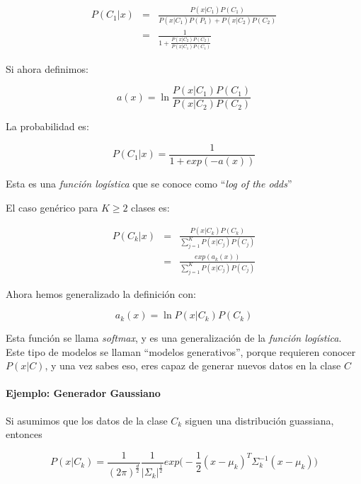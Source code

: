 \begin{eqnarray*}
 P(C_1 | x)
 &=&
 \frac{P(x | C_1) P(C_1)}
 {
  P(x | C_1)P(P_1) + P(x | C_2)P(C_2)
 } \\
 &=&
 \frac{1}
 {
  1 + \frac
  {P(x | C_2)P(C_2)}
  {P(x | C_1)P(C_1)}
 }
\end{eqnarray*}

Si ahora definimos:

\begin{equation*}
 a(x) = \ln
 \frac
 {P(x | C_1)P(C_1)}
 {P(x | C_2)P(C_2)}
\end{equation*}

La probabilidad es:

\begin{equation*}
 P(C_1 | x) = \frac{1}
 {1 + exp(-a(x))}
\end{equation*}

Esta es una \textit{función logística} que se conoce como
``\textit{log of the odds}''

El caso genérico para $K \geq 2$ clases es:

\begin{eqnarray*}
 P(C_k | x)
 &=&
 \frac
 {P(x | C_k)P(C_k)}
 {
  \sum_{j = 1}^{K} P(x | C_j)P(C_j)
 } \\
 &=&
 \frac
 {exp(a_k(x))}
 {\sum_{j = 1}^{K} P(x | C_j)P(C_j)}
\end{eqnarray*}

Ahora hemos generalizado la definición con:

\begin{equation*}
 a_k(x) = \ln
 P(x | C_k)P(C_k)
\end{equation*}


Esta función se llama \textit{softmax}, y es una generalización de la \textit{función logística}. Este tipo de modelos se llaman ``modelos generativos'', porque requieren conocer $P(x | C)$, y una vez sabes eso, eres capaz de generar nuevos datos en la clase $C$

\paragraph{Ejemplo: Generador Gaussiano}
Si asumimos que los datos de la clase $C_k$ siguen una distribución guassiana, entonces

\begin{equation*}
    P(x | C_k) =
    \frac{1}{(2\pi)^{\frac{d}{2}}}
    \frac{1}{|\Sigma_k|^{\frac{1}{2}}}
    exp\Big(
    -\frac{1}{2}
    (x - \mu_k)^T
    \Sigma_k^{-1}
    (x - \mu_k)
    \Big)
\end{equation*}

